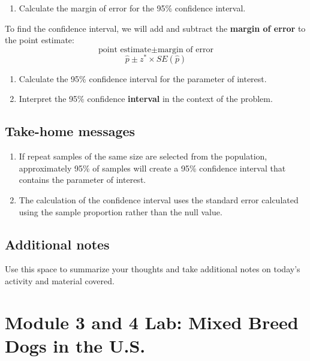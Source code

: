 \documentclass[
]{report}
\providecommand{\tightlist}{%
  \setlength{\itemsep}{0pt}\setlength{\parskip}{0pt}}
\begin{document}
\begin{enumerate}
\def\labelenumi{\arabic{enumi}.}
\setcounter{enumi}{9}
\tightlist
\item
  Calculate the margin of error for the 95\% confidence interval.
  \vspace{0.6in}
\end{enumerate}

To find the confidence interval, we will add and subtract the \textbf{margin of error} to the point estimate:
\[\text{point estimate}\pm\text{margin of error}\]
\[\hat{p}\pm z^* \times SE(\hat{p})\]

\begin{enumerate}
\def\labelenumi{\arabic{enumi}.}
\setcounter{enumi}{10}
\item
  Calculate the 95\% confidence interval for the parameter of interest.
  \vspace{0.6in}
\item
  Interpret the 95\% confidence \textbf{interval} in the context of the problem.
  \vspace{1in}
\end{enumerate}

\subsection{Take-home messages}\label{take-home-messages-9}

\begin{enumerate}
\def\labelenumi{\arabic{enumi}.}
\item
  If repeat samples of the same size are selected from the population, approximately 95\% of samples will create a 95\% confidence interval that contains the parameter of interest.
\item
  The calculation of the confidence interval uses the standard error calculated using the sample proportion rather than the null value.
\end{enumerate}

\subsection{Additional notes}\label{additional-notes-9}

Use this space to summarize your thoughts and take additional notes on today's activity and material covered.

\newpage

\section{Module 3 and 4 Lab: Mixed Breed Dogs in the U.S.}\label{module-3-and-4-lab-mixed-breed-dogs-in-the-u.s.}
\end{document}
